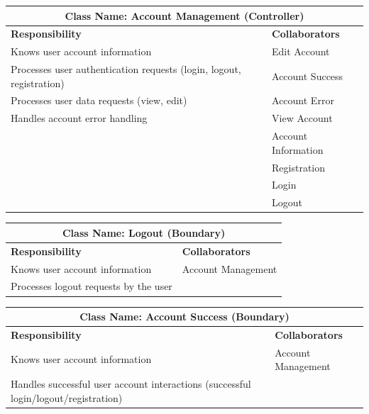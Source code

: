 \documentclass[]{article}
\begin{document}
\begin{itemize}
\begin{table}[H]
\begin{tabular}{|p{6cm}|p{6cm}|}
            \hline 
             \multicolumn{2}{|c|}{\textbf{Class Name: Account Management (Controller)}} \\
            \hline
            \textbf{Responsibility} & \textbf{Collaborators} \\
            \hline
            Knows user account information & Edit Account\\
            Processes user authentication requests (login, logout, registration) & Account Success\\
            Processes user data requests (view, edit) & Account Error\\
            Handles account error handling & View Account\\
            & Account Information \\
            & Registration\\
            & Login\\
            & Logout\\
            \hline
            \end{tabular}
        \end{table}
        \begin{table}[H]
            \centering
            \begin{tabular}{|p{6cm}|p{6cm}|}
            \hline 
             \multicolumn{2}{|c|}{\textbf{Class Name: Logout (Boundary)}} \\
            \hline
            \textbf{Responsibility} & \textbf{Collaborators} \\
            \hline
            Knows user account information & Account Management\\
            Processes logout requests by the user & \\
            \hline
            \end{tabular}
        \end{table}
        \begin{table}[H]
            \centering
            \begin{tabular}{|p{6cm}|p{6cm}|}
            \hline 
             \multicolumn{2}{|c|}{\textbf{Class Name: Account Success (Boundary)}} \\
            \hline
            \textbf{Responsibility} & \textbf{Collaborators} \\
            \hline
            Knows user account information & Account Management\\
            Handles successful user account interactions (successful login/logout/registration) & \\

\end{tabular}
\end{table}
\end{itemize}
\end{document}
